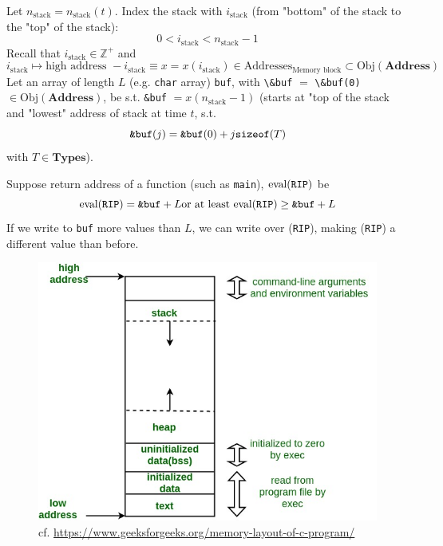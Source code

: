 \documentclass[10pt]{amsart}
\begin{document}
Let $n_{\text{stack}} = n_{\text{stack}}(t)$.  Index the stack with $i_{\text{stack}}$ (from "bottom" of the stack to the "top" of the stack):
\[
0 < i_{\text{stack}} < n_{\text{stack}} - 1
\]
Recall that $i_{\text{stack}} \in \mathbb{Z}^+$ and 
\[
i_{\text{stack}} \mapsto \text{high address } - i_{\text{stack}} \equiv x = x(i_{\text{stack}}) \in \text{Addresses}_{\text{Memory block}} \subset \text{Obj}(\textbf{Address})
\]
Let an array of length $L$ (e.g. \verb|char| array) \verb|buf|, with \verb|\&buf| $=$ \verb|\&buf(0)| $\in  \text{Obj}{(\textbf{Address})}$, be s.t. \verb|&buf| $=x(n_{\text{stack}}-1)$ (starts at "top of the stack and "lowest" address of stack at time $t$, s.t. 
\[
\verb|&buf|(j) = \verb|&buf|(0) + j \verb|sizeof|(T)
\]
with $T\in \textbf{Types}$).  


Suppose return address of a function (such as \verb|main|), $\text{eval}(\verb|RIP|)$ be 
\[
\text{eval}(\verb|RIP|) = \verb|&buf| + L \text{or at least } \text{eval}(\verb|RIP|) \geq \verb|&buf| + L
\]
If we write to \verb|buf| more values than $L$, we can write over (\verb|RIP|), making (\verb|RIP|) a different value than before.  

\begin{figure}
	\centering
	\begin{minipage}{.5\textwidth}
		\includegraphics[width=1.2\textwidth]{images/Cmemory/memoryLayoutC.jpg}
		\caption{cf. \url{https://www.geeksforgeeks.org/memory-layout-of-c-program/}}
		\label{Fig:TypicalCMemoryLayout}
	\end{minipage}
\end{figure}
\end{document}
